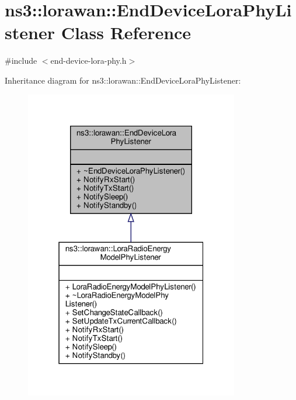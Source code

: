 \hypertarget{classns3_1_1lorawan_1_1EndDeviceLoraPhyListener}{}\section{ns3\+:\+:lorawan\+:\+:End\+Device\+Lora\+Phy\+Listener Class Reference}
\label{classns3_1_1lorawan_1_1EndDeviceLoraPhyListener}


{\ttfamily \#include $<$end-\/device-\/lora-\/phy.\+h$>$}



Inheritance diagram for ns3\+:\+:lorawan\+:\+:End\+Device\+Lora\+Phy\+Listener\+:
\nopagebreak
\begin{figure}[H]
\begin{center}
\leavevmode
\includegraphics[width=265pt]{classns3_1_1lorawan_1_1EndDeviceLoraPhyListener__inherit__graph}
\end{center}
\end{figure}



